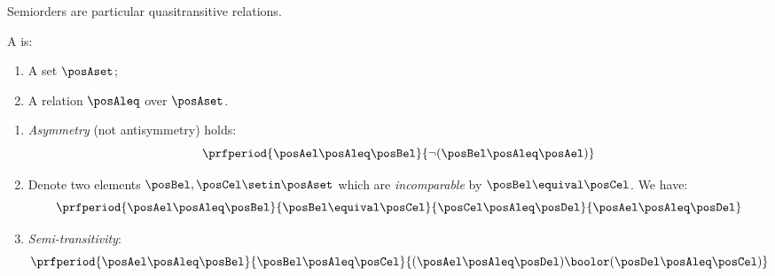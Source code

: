 Semiorders are particular quasitransitive relations.
\begin{definition}[Semiorder]\label{def:semiorder}
    A  is:

    \constit
    \begin{enumerate}
        \item A set $\posAset$;
        \item A relation $\posAleq$ over $\posAset$.
    \end{enumerate}

    \condit
    \begin{enumerate}
        \item \emph{Asymmetry} (not antisymmetry) holds:
              \begin{equation}\label{eq:semiorder-asym}
                  \prfperiod{
                      \posAel \posAleq \posBel
                  }{
                      \neg(\posBel \posAleq \posAel)
                  }
              \end{equation}
        \item Denote two elements $\posBel, \posCel \setin \posAset$ which are \emph{incomparable} by $\posBel \equival \posCel$.
              We have:
              \begin{equation}\label{eq:el-incomparable}
                  \prfperiod{
                      \posAel \posAleq \posBel
                  }{
                      \posBel \equival \posCel
                  }{
                      \posCel \posAleq \posDel
                  }{
                      \posAel \posAleq \posDel
                  }
              \end{equation}
        \item \emph{Semi-transitivity}:
              \begin{equation}\label{eq:semiorder-2}
                  \prfperiod{
                      \posAel \posAleq \posBel
                  }{
                      \posBel \posAleq \posCel
                  }{
                      (\posAel \posAleq \posDel) \boolor (\posDel \posAleq \posCel)
                  }
              \end{equation}
    \end{enumerate}
\end{definition}
